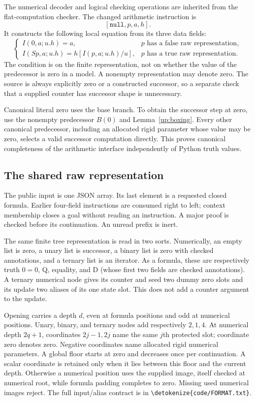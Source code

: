 \documentclass[11pt,letterpaper]{article}
\theoremstyle{definition}\newtheorem{definition}[theorem]{Definition}
\theoremstyle{remark}\newtheorem{remark}[theorem]{Remark}
\newcommand{\file}[1]{\expandafter\nolinkurl\expandafter{\detokenize{#1}}}
\begin{document}
The numerical decoder and logical checking operations are inherited from
the flat-computation checker. The changed arithmetic instruction is
\[
                    [\mathtt{null},p,a,h].
\]
It constructs the following local equation from its three data fields:
\[
 \begin{cases}
 I(0,a;u.h)=a,&p\text{ has a false raw representation},\\
 I(Sp,a;u.h)=h[I(p,a;u.h)/u],&p\text{ has a true raw representation}.
 \end{cases}
\]
The condition is on the finite representation, not on whether the value
of the predecessor is zero in a model. A nonempty representation may
denote zero. The source is always explicitly zero or a constructed
successor, so a separate check that a supplied counter has successor
shape is unnecessary.

Canonical literal zero uses the base branch. To obtain the successor step
at zero, use the nonempty predecessor $B(0)$ and
Lemma~\ref{up:boxing}. Every other canonical predecessor, including an
allocated rigid parameter whose value may be zero, selects a valid
successor computation directly. This proves canonical completeness of
the arithmetic interface independently of Python truth values.

\subsection{The shared raw representation}

The public input is one JSON array. Its last element is a requested closed
formula. Earlier four-field instructions are consumed right to left;
context membership closes a goal without reading an instruction. A major
proof is checked before its continuation. An unread prefix is inert.

The same finite tree representation is read in two sorts. Numerically,
an empty list is zero, a unary list is successor, a binary list is zero
with checked annotations, and a ternary list is an iterator. As a formula,
these are respectively truth $0=0$, Q, equality, and D (whose first two
fields are checked annotations). A ternary numerical node gives its
counter and seed two dummy zero slots and its update two aliases of its
one state slot. This does not add a counter argument to the update.

Opening carries a depth $d$, even at formula positions and odd at
numerical positions. Unary, binary, and ternary nodes add respectively
$2,1,4$. At numerical depth $2q+1$, coordinates $2j-1,2j$ name the same
$j$th protected slot; coordinate zero denotes zero. Negative coordinates
name allocated rigid numerical parameters. A global floor starts at zero
and decreases once per continuation. A scalar coordinate is retained only
when it lies between this floor and the current depth. Otherwise a
numerical position uses the supplied image, itself checked at numerical
root, while formula padding completes to zero. Missing used numerical
images reject. The full input/alias contract is in \file{code/FORMAT.txt}.
\end{document}
